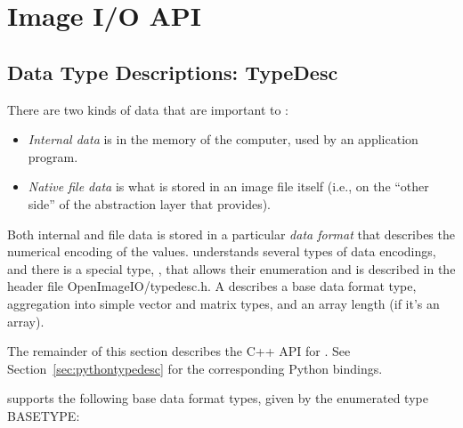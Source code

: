 \chapter{Image I/O API}
\label{chap:imageioapi}



\section{Data Type Descriptions: {\cf TypeDesc}}
\label{sec:dataformats}
\label{sec:TypeDesc}

There are two kinds of data that are important to \product:

\begin{itemize}
\item \emph{Internal data} is in the memory of the computer, used by an
  application program.
\item \emph{Native file data} is what is stored in an image file itself
  (i.e., on the ``other side'' of the abstraction layer that \product
  provides).
\end{itemize}

Both internal and file data is stored in a particular \emph{data format}
that describes the numerical encoding of the values.  \product
understands several types of data encodings, and there is 
a special type, \TypeDesc, that allows their enumeration and
is described in the header file {\cf OpenImageIO/typedesc.h}.
A \TypeDesc describes a base data format type, aggregation into simple
vector and matrix types, and an array length (if
it's an array).

The remainder of this section describes the C++ API for \TypeDesc.
See Section~\ref{sec:pythontypedesc} for the corresponding Python
bindings.

\TypeDesc supports the following base data format types, given by the
enumerated type {\cf BASETYPE}:

\medskip

